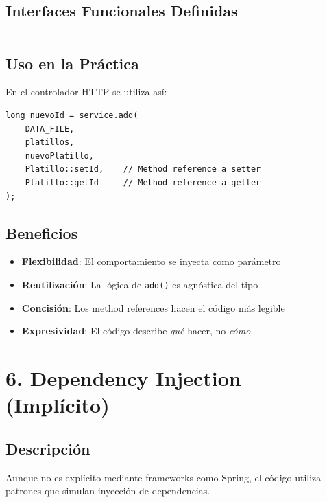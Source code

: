 \documentclass[12pt, a4paper]{report}
\begin{document}
\subsection{Interfaces Funcionales Definidas}

\inputminted[firstline=35, lastline=40]{java}{../../src/main/java/com/wallpawawqi/services/JsonPersistenceService.java}

\subsection{Uso en la Práctica}

En el controlador HTTP se utiliza así:

\begin{verbatim}
long nuevoId = service.add(
    DATA_FILE,
    platillos,
    nuevoPlatillo,
    Platillo::setId,    // Method reference a setter
    Platillo::getId     // Method reference a getter
);
\end{verbatim}

\subsection{Beneficios}

\begin{itemize}
    \item \textbf{Flexibilidad}: El comportamiento se inyecta como parámetro
    \item \textbf{Reutilización}: La lógica de \texttt{add()} es agnóstica del tipo
    \item \textbf{Concisión}: Los method references hacen el código más legible
    \item \textbf{Expresividad}: El código describe \textit{qué} hacer, no \textit{cómo}
\end{itemize}

\newpage

\section{6. Dependency Injection (Implícito)}

\subsection{Descripción}

Aunque no es explícito mediante frameworks como Spring, el código utiliza patrones que simulan inyección de dependencias.
\end{document}

